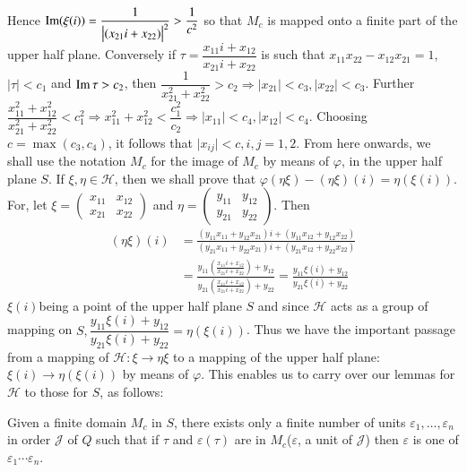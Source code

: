 Hence $\operatorname{Im}  (\xi (i)) = \dfrac{1}{\big|(x_{21} i + x_{22})\big|^2} >
\dfrac{1}{c^2}$ so that $M_c$ is mapped onto a finite part of the
upper half plane. Conversely if $\tau = \dfrac{x_{11} i +
  x_{12}}{x_{21} i + x_{22}}$ is such that $ x_{11} x_{22} - x_{12}
x_{21} =1$, $|\tau| < c_1$ and $\operatorname{Im}  \tau > c_2$, then
$\dfrac{1}{x^{2}_{21}+ x^{2}_{22}} > c_2 \Longrightarrow
\big|x_{21}\big| < c_3,  \big| x_{22}\big| < c_3$. Further
$\dfrac{x^{2}_{11} + x^{2}_{12}}{x^{2}_{21} + x^{2}_{22}} < c^{2}_{1}
\Longrightarrow x^{2}_{11} + x^{2}_{12} < \dfrac{c_1^2}{c_2}
\Longrightarrow \big|x_{11} 
\big| < c_4,  \big|x_{12}\big| < c_4$. Choosing $c = \max (c_3,
c_4)$, it follows that $\big|x_{ij}| < c,  i,  j = 1, 2$. From here
onwards, we shall use the notation $M_c$ for the image of $M_c$ by
means of $\varphi$, in the upper half plane $S$. If $\xi,  \eta \in
\mathscr{H}$, then we shall prove that $\varphi (\eta \xi) - (\eta
\xi) (i) = \eta (\xi (i))$. For, let $\xi = \begin{pmatrix} x_{11}
  &x_{12}\\ x_{21} & x_{22} \end{pmatrix}$ and $\eta = \begin{pmatrix}
  y_{11}& y_{12} \\ y_{21} & y_{22}\end{pmatrix}$. Then  
\begin{align*}
 (\eta \xi ) (i) & = \frac{(y_{11} x_{11} + y_{12} x_{21}) i + (y_{11}
  x_{12} + y_{12} x_{22})}{(y_{21}x_{11} + y_{22} x_{21}) i + (y_{21}
  x_{12} + y_{22} x_{22})} \\
 & = \frac{y_{11} \left(\frac{x_{11} i + x_{12}}{x_{21} i + x_{22}}\right) +
  y_{12}}{y_{21}\left(\frac{x_{11}i + x_{12}}{x_{21} i + x_{22}}\right) +
  y_{22}} = \frac{y_{11} \xi (i) + y_{12}}{y_{21} \xi (i) + y_{22}}
\end{align*}
$\xi (i)$\pageoriginale being a point of the upper half plane $S$ and since
$\mathscr{H}$ acts as a group of mapping on $S, \dfrac{y_{11} \xi (i)
  + y_{12}}{y_{21} \xi (i)+ y_{22}} = \eta (\xi (i))$. Thus we have the
important passage from a mapping of $\mathscr{H} : \xi \to \eta \xi$
to a mapping of the upper half plane: $\xi (i) \to \eta (\xi (i))$ by
means of $\varphi$. This enables us to carry over our lemmas for
$\mathscr{H}$ to those for $S$, as follows: 

\begin{lem}\label{chap2:sec4:lem'1} %
  Given a finite domain $M_c$ in $S$, there exists only a finite
  number of units $\varepsilon_1,  \ldots,  \varepsilon_n$ in order
  $\mathcal{J}$ of $Q$ such that if $\tau$ and $\varepsilon (\tau)$
  are in $M_c$($\varepsilon$, a unit of $\mathcal{J}$) then
  $\varepsilon$ is one of $\varepsilon _1 \cdots \varepsilon_n$.  
\end{lem}

